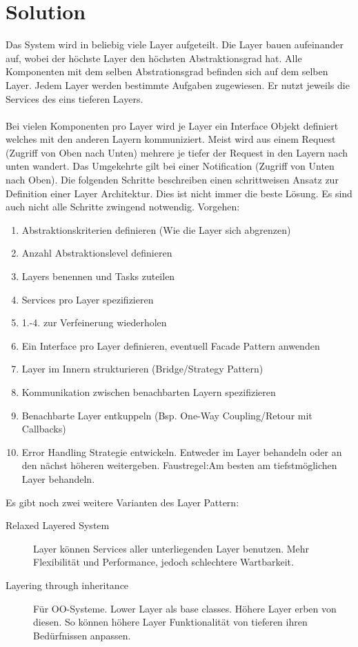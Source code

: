 \section{Solution}
Das System wird in beliebig viele Layer aufgeteilt. Die Layer bauen aufeinander auf, wobei der höchste Layer den höchsten Abstraktionsgrad hat. Alle Komponenten mit dem selben Abstrationsgrad befinden sich auf dem selben Layer. Jedem Layer werden bestimmte Aufgaben zugewiesen. Er nutzt jeweils die Services des eins tieferen Layers. \\\\
Bei vielen Komponenten pro Layer wird je Layer ein Interface Objekt definiert welches mit den anderen Layern kommuniziert. Meist wird aus einem Request (Zugriff von Oben nach Unten) mehrere je tiefer der Request in den Layern nach unten wandert. Das Umgekehrte gilt bei einer Notification (Zugriff von Unten nach Oben).
Die folgenden Schritte beschreiben einen schrittweisen Ansatz zur Definition einer Layer Architektur. Dies ist nicht immer die beste Lösung. Es sind auch nicht alle Schritte zwingend notwendig. Vorgehen:
\begin{enumerate}
	\item Abstraktionskriterien definieren (Wie die Layer sich abgrenzen)
	\item Anzahl Abstraktionslevel definieren
	\item Layers benennen und Tasks zuteilen
	\item Services pro Layer spezifizieren
	\item 1.-4. zur Verfeinerung wiederholen
	\item Ein Interface pro Layer definieren, eventuell Facade Pattern anwenden
	\item Layer im Innern strukturieren (Bridge/Strategy Pattern)
	\item Kommunikation zwischen benachbarten Layern spezifizieren
	\item Benachbarte Layer entkuppeln (Bsp. One-Way Coupling/Retour mit Callbacks)
	\item Error Handling Strategie entwickeln. Entweder im Layer behandeln oder an den nächst höheren weitergeben. Faustregel:Am besten am tiefstmöglichen Layer behandeln.
\end{enumerate}
Es gibt noch zwei weitere Varianten des Layer Pattern:
\begin{description}
	\item[Relaxed Layered System] Layer können Services aller unterliegenden Layer benutzen. Mehr Flexibilität und Performance, jedoch schlechtere Wartbarkeit.
	\item[Layering through inheritance] Für OO-Systeme. Lower Layer als base classes. Höhere Layer erben von diesen. So können höhere Layer Funktionalität von tieferen ihren Bedürfnissen anpassen.
\end{description}

